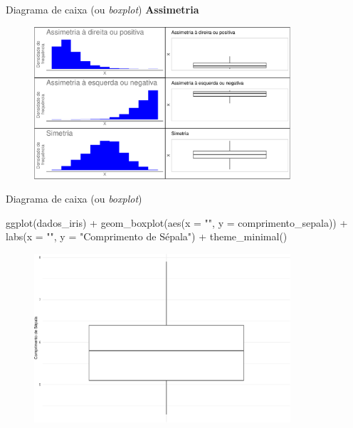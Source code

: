 \documentclass[
  10pt,
  ignorenonframetext,
]{beamer}
\newenvironment{Shaded}{\begin{snugshade}}{\end{snugshade}}
\newcommand{\AttributeTok}[1]{\textcolor[rgb]{0.40,0.45,0.13}{#1}}
\newcommand{\FunctionTok}[1]{\textcolor[rgb]{0.28,0.35,0.67}{#1}}
\newcommand{\NormalTok}[1]{\textcolor[rgb]{0.00,0.23,0.31}{#1}}
\newcommand{\SpecialCharTok}[1]{\textcolor[rgb]{0.37,0.37,0.37}{#1}}
\newcommand{\StringTok}[1]{\textcolor[rgb]{0.13,0.47,0.30}{#1}}
\begin{document}
\begin{frame}{Diagrama de caixa (ou \emph{boxplot})}
\protect\hypertarget{diagrama-de-caixa-ou-boxplot-3}{}
\textbf{Assimetria}

\begin{figure}

{\centering \includegraphics[width=0.85\textwidth,height=\textheight]{exploracao-visualizacao_files/figure-beamer/unnamed-chunk-81-1.pdf}

}

\end{figure}
\end{frame}

\begin{frame}[fragile]{Diagrama de caixa (ou \emph{boxplot})}
\protect\hypertarget{diagrama-de-caixa-ou-boxplot-4}{}
\begin{Shaded}
\begin{Highlighting}[]
\FunctionTok{ggplot}\NormalTok{(dados\_iris) }\SpecialCharTok{+}
  \FunctionTok{geom\_boxplot}\NormalTok{(}\FunctionTok{aes}\NormalTok{(}\AttributeTok{x =} \StringTok{""}\NormalTok{, }\AttributeTok{y =}\NormalTok{ comprimento\_sepala)) }\SpecialCharTok{+}
  \FunctionTok{labs}\NormalTok{(}\AttributeTok{x =} \StringTok{""}\NormalTok{, }\AttributeTok{y =} \StringTok{"Comprimento de Sépala"}\NormalTok{) }\SpecialCharTok{+}
  \FunctionTok{theme\_minimal}\NormalTok{()}
\end{Highlighting}
\end{Shaded}

\begin{figure}

{\centering \includegraphics[width=0.85\textwidth,height=\textheight]{exploracao-visualizacao_files/figure-beamer/unnamed-chunk-82-1.pdf}

}

\end{figure}
\end{frame}
\end{document}
